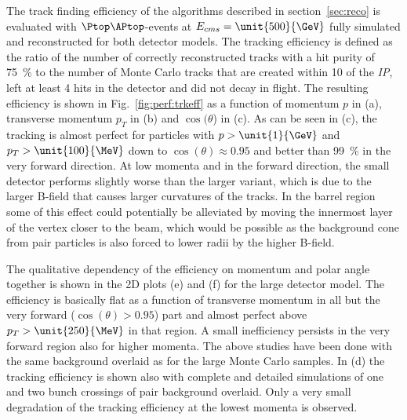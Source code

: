 The track finding efficiency of the algorithms described in section~\ref{sec:reco} is evaluated with $\Ptop\APtop$-events
at $E_{cms}=\unit{500}{\GeV}$ fully simulated and reconstructed for both detector models.
The tracking efficiency is defined as the ratio of the number of correctly reconstructed tracks with a hit purity of 75~\% to the
number of Monte Carlo tracks that are created within \unit{10}{\cm} of the {\em IP}, left at least 4 hits in the detector and
did not decay in flight. The resulting efficiency is shown in Fig.~\ref{fig:perf:trkeff} as a function of momentum $p$ in (a),
transverse momentum $p_T$ in (b) and $\cos(\theta$) in (c). As can be seen in (c), the tracking is almost perfect for particles
with $p>\unit{1}{\GeV}$ and $p_T>\unit{100}{\MeV}$ down to $\cos(\theta) \approx 0.95$ and better than 99~\% in the very forward
direction. At low momenta and in the forward direction, the small detector performs slightly worse than the larger variant, which
is due to the larger B-field that causes larger curvatures of the tracks. In the barrel region some of this effect could potentially
be alleviated by moving the innermost layer of the vertex closer to the beam, which would be possible as the background cone from
pair particles is also forced to lower radii by the higher B-field.

The qualitative dependency of the efficiency on momentum and polar angle together is shown in the 2D plots (e) and (f) for the large
detector model. The efficiency is basically flat as a function of transverse momentum in all but the very forward ($\cos(\theta)>0.95$)
part and almost perfect above $p_T>\unit{250}{\MeV}$ in that region. A small inefficiency persists in the very forward region
also for higher momenta. The above studies have been done with the same background overlaid as for the large Monte Carlo samples.
In (d) the tracking efficiency is shown also with complete and detailed simulations of one and two bunch crossings of pair
background overlaid. Only a very small degradation of the tracking efficiency at the lowest momenta is observed.

